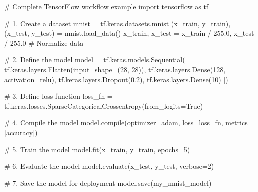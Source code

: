 \documentclass[
  letterpaper,
  DIV=11,
  numbers=noendperiod]{scrreprt}
\newenvironment{Shaded}{\begin{snugshade}}{\end{snugshade}}
\newcommand{\BuiltInTok}[1]{\textcolor[rgb]{0.00,0.23,0.31}{#1}}
\newcommand{\CommentTok}[1]{\textcolor[rgb]{0.37,0.37,0.37}{#1}}
\newcommand{\DecValTok}[1]{\textcolor[rgb]{0.68,0.00,0.00}{#1}}
\newcommand{\FloatTok}[1]{\textcolor[rgb]{0.68,0.00,0.00}{#1}}
\newcommand{\ImportTok}[1]{\textcolor[rgb]{0.00,0.46,0.62}{#1}}
\newcommand{\NormalTok}[1]{\textcolor[rgb]{0.00,0.23,0.31}{#1}}
\newcommand{\OperatorTok}[1]{\textcolor[rgb]{0.37,0.37,0.37}{#1}}
\newcommand{\StringTok}[1]{\textcolor[rgb]{0.13,0.47,0.30}{#1}}
\newcommand{\VariableTok}[1]{\textcolor[rgb]{0.07,0.07,0.07}{#1}}
\begin{document}
\begin{Shaded}
\begin{Highlighting}[]
\CommentTok{\# Complete TensorFlow workflow example}
\ImportTok{import}\NormalTok{ tensorflow }\ImportTok{as}\NormalTok{ tf}

\CommentTok{\# 1. Create a dataset}
\NormalTok{mnist }\OperatorTok{=}\NormalTok{ tf.keras.datasets.mnist}
\NormalTok{(x\_train, y\_train), (x\_test, y\_test) }\OperatorTok{=}\NormalTok{ mnist.load\_data()}
\NormalTok{x\_train, x\_test }\OperatorTok{=}\NormalTok{ x\_train }\OperatorTok{/} \FloatTok{255.0}\NormalTok{, x\_test }\OperatorTok{/} \FloatTok{255.0}  \CommentTok{\# Normalize data}

\CommentTok{\# 2. Define the model}
\NormalTok{model }\OperatorTok{=}\NormalTok{ tf.keras.models.Sequential([}
\NormalTok{  tf.keras.layers.Flatten(input\_shape}\OperatorTok{=}\NormalTok{(}\DecValTok{28}\NormalTok{, }\DecValTok{28}\NormalTok{)),}
\NormalTok{  tf.keras.layers.Dense(}\DecValTok{128}\NormalTok{, activation}\OperatorTok{=}\StringTok{\textquotesingle{}relu\textquotesingle{}}\NormalTok{),}
\NormalTok{  tf.keras.layers.Dropout(}\FloatTok{0.2}\NormalTok{),}
\NormalTok{  tf.keras.layers.Dense(}\DecValTok{10}\NormalTok{)}
\NormalTok{])}

\CommentTok{\# 3. Define loss function}
\NormalTok{loss\_fn }\OperatorTok{=}\NormalTok{ tf.keras.losses.SparseCategoricalCrossentropy(from\_logits}\OperatorTok{=}\VariableTok{True}\NormalTok{)}

\CommentTok{\# 4. Compile the model}
\NormalTok{model.}\BuiltInTok{compile}\NormalTok{(optimizer}\OperatorTok{=}\StringTok{\textquotesingle{}adam\textquotesingle{}}\NormalTok{,}
\NormalTok{              loss}\OperatorTok{=}\NormalTok{loss\_fn,}
\NormalTok{              metrics}\OperatorTok{=}\NormalTok{[}\StringTok{\textquotesingle{}accuracy\textquotesingle{}}\NormalTok{])}

\CommentTok{\# 5. Train the model}
\NormalTok{model.fit(x\_train, y\_train, epochs}\OperatorTok{=}\DecValTok{5}\NormalTok{)}

\CommentTok{\# 6. Evaluate the model}
\NormalTok{model.evaluate(x\_test, y\_test, verbose}\OperatorTok{=}\DecValTok{2}\NormalTok{)}

\CommentTok{\# 7. Save the model for deployment}
\NormalTok{model.save(}\StringTok{\textquotesingle{}my\_mnist\_model\textquotesingle{}}\NormalTok{)}
\end{Highlighting}
\end{Shaded}
\end{document}
